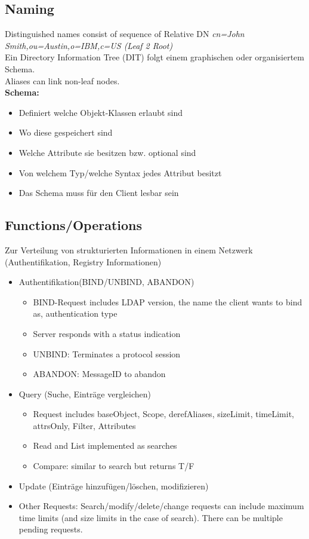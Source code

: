 \documentclass{article} %
\begin{document}
\subsection{Naming}
Distinguished names consist of sequence of Relative DN \textit{cn=John Smith,ou=Austin,o=IBM,c=US (Leaf 2 Root) } \\
Ein Directory Information Tree (DIT) folgt einem graphischen oder organisiertem Schema. \\
Aliases can link non-leaf nodes.\\

\noindent\textbf{Schema:}
	\begin{itemize}
	\item Definiert welche Objekt-Klassen erlaubt sind
	\item Wo diese gespeichert sind
	\item Welche Attribute sie besitzen bzw. optional sind
	\item Von welchem Typ/welche Syntax jedes Attribut besitzt
	\item Das Schema muss für den Client lesbar sein
	\end{itemize}

\subsection{Functions/Operations}
Zur Verteilung von strukturierten Informationen in einem Netzwerk (Authentifikation, Registry Informationen)	
	\begin{itemize}
	\item Authentifikation(BIND/UNBIND, ABANDON)
		\begin{itemize}
		\item BIND-Request includes LDAP version, the name the client wants to bind as, authentication type
		\item Server responds with a status indication 
		\item UNBIND: Terminates a protocol session
		\item ABANDON:  MessageID to abandon
		\end{itemize}
	\item Query (Suche, Einträge vergleichen)
		\begin{itemize}
		\item Request includes baseObject, Scope, derefAliases, sizeLimit, timeLimit, attrsOnly, Filter, Attributes
		\item Read and List implemented as searches 
		\item Compare: similar to search but returns T/F
		\end{itemize}
	\item Update (Einträge hinzufügen/löschen, modifizieren)
	\item Other Requests: Search/modify/delete/change requests can include maximum time limits (and size limits in the case of search). There can be multiple pending requests.
	\end{itemize}	
\end{document}
